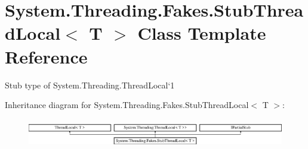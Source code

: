 \hypertarget{class_system_1_1_threading_1_1_fakes_1_1_stub_thread_local_3_01_t_01_4}{\section{System.\-Threading.\-Fakes.\-Stub\-Thread\-Local$<$ T $>$ Class Template Reference}
\label{class_system_1_1_threading_1_1_fakes_1_1_stub_thread_local_3_01_t_01_4}
}


Stub type of System.\-Threading.\-Thread\-Local`1 


Inheritance diagram for System.\-Threading.\-Fakes.\-Stub\-Thread\-Local$<$ T $>$\-:\begin{figure}[H]
\begin{center}
\leavevmode
\includegraphics[height=1.287356cm]{class_system_1_1_threading_1_1_fakes_1_1_stub_thread_local_3_01_t_01_4}
\end{center}
\end{figure}
